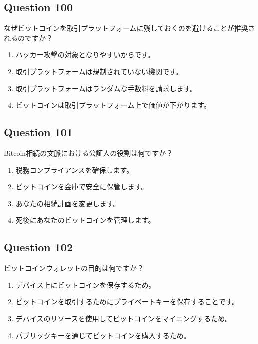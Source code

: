 \documentclass[12pt,a4paper]{article}
\begin{document}
\subsection*{Question 100}
なぜビットコインを取引プラットフォームに残しておくのを避けることが推奨されるのですか？

\begin{enumerate}[label=\Alph*., leftmargin=*]
\item ハッカー攻撃の対象となりやすいからです。
\item 取引プラットフォームは規制されていない機関です。
\item 取引プラットフォームはランダムな手数料を請求します。
\item ビットコインは取引プラットフォーム上で価値が下がります。
\end{enumerate}

\bigskip


\subsection*{Question 101}
Bitcoin相続の文脈における公証人の役割は何ですか？

\begin{enumerate}[label=\Alph*., leftmargin=*]
\item 税務コンプライアンスを確保します。
\item ビットコインを金庫で安全に保管します。
\item あなたの相続計画を変更します。
\item 死後にあなたのビットコインを管理します。
\end{enumerate}

\bigskip


\subsection*{Question 102}
ビットコインウォレットの目的は何ですか？

\begin{enumerate}[label=\Alph*., leftmargin=*]
\item デバイス上にビットコインを保存するため。
\item ビットコインを取引するためにプライベートキーを保存することです。
\item デバイスのリソースを使用してビットコインをマイニングするため。
\item パブリックキーを通じてビットコインを購入するため。
\end{enumerate}
\end{document}
